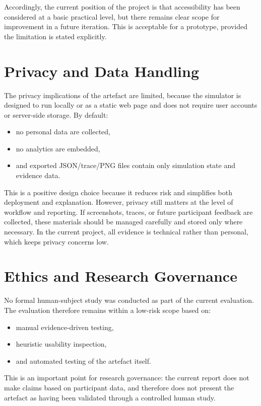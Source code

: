Accordingly, the current position of the project is that accessibility has been considered at a basic practical level, but there remains clear scope for improvement in a future iteration. This is acceptable for a prototype, provided the limitation is stated explicitly.

\section{Privacy and Data Handling}
The privacy implications of the artefact are limited, because the simulator is designed to run locally or as a static web page and does not require user accounts or server-side storage. By default:
\begin{itemize}
  \item no personal data are collected,
  \item no analytics are embedded,
  \item and exported JSON/trace/PNG files contain only simulation state and evidence data.
\end{itemize}

This is a positive design choice because it reduces risk and simplifies both deployment and explanation. However, privacy still matters at the level of workflow and reporting. If screenshots, traces, or future participant feedback are collected, these materials should be managed carefully and stored only where necessary. In the current project, all evidence is technical rather than personal, which keeps privacy concerns low.

\section{Ethics and Research Governance}
No formal human-subject study was conducted as part of the current evaluation. The evaluation therefore remains within a low-risk scope based on:
\begin{itemize}
  \item manual evidence-driven testing,
  \item heuristic usability inspection,
  \item and automated testing of the artefact itself.
\end{itemize}

This is an important point for research governance: the current report does not make claims based on participant data, and therefore does not present the artefact as having been validated through a controlled human study.

